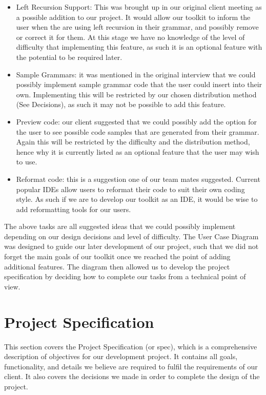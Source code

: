 \documentclass{l3proj}
\begin{document}
\begin {itemize}
	\item Left Recursion Support: This was brought up in our original client meeting as a possible addition to our project. It would allow our toolkit to inform the user when the are using left recursion in their grammar, and possibly remove or correct it for them. At this stage we have no knowledge of the level of difficulty that implementing this feature, as such it is an optional feature with the potential to be required later.
	\item Sample Grammars: it was mentioned in the original interview that we could possibly implement sample grammar code that the user could insert into their own. Implementing this will be restricted by our chosen distribution method (See Decisions), as such it may not be possible to add this feature.
	\item Preview code: our client suggested that we could possibly add the option for the user to see possible code samples that are generated from their grammar. Again this will be restricted by the difficulty and the distribution method, hence why it is currently listed as an optional feature that the user may wish to use.
	\item Reformat code: this is a suggestion one of our team mates suggested. Current popular IDEs allow users to reformat their code to suit their own coding style. As such if we are to develop our toolkit as an IDE, it would be wise to add reformatting tools for our users.
\end {itemize}

The above tasks are all suggested ideas that we could possibly implement depending on our design decisions and level of difficulty. The User Case Diagram was designed to guide our later development of our project, such that we did not forget the main goals of our toolkit once we reached the point of adding additional features. The diagram then allowed us to develop the project specification by deciding how to complete our tasks from a technical point of view.

\section{Project Specification}
This section covers the Project Specification (or spec), which is a comprehensive description of objectives for our development project. It contains all goals, functionality, and details we believe are required to fulfil the requirements of our client. It also covers the decisions we made in order to complete the design of the project. \\
\\
\end{document}
